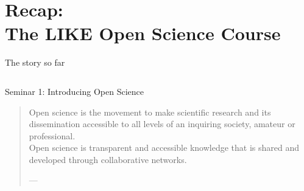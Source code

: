 \section[The course]{Recap:\\ The LIKE Open Science Course}
\label{sec:course}

\begin{frame}{The story so far}

\begin{columns}
    \begin{column}{.45\textwidth}
    \begin{block}{Seminar 1: Introducing Open Science}
        \begin{quotation}
        Open science is the movement to make scientific research and its dissemination accessible to all levels of an inquiring society, amateur or professional. \\
        Open science is transparent and accessible knowledge that is shared and developed through collaborative networks.
        \begin{flushright}
            \tiny{---}
        \end{flushright}
        \end{quotation}
    \end{block}
    
    \end{column}
    
    \begin{column}{.45\textwidth}
    
    
    \end{column}
    
\end{columns}

\end{frame}



